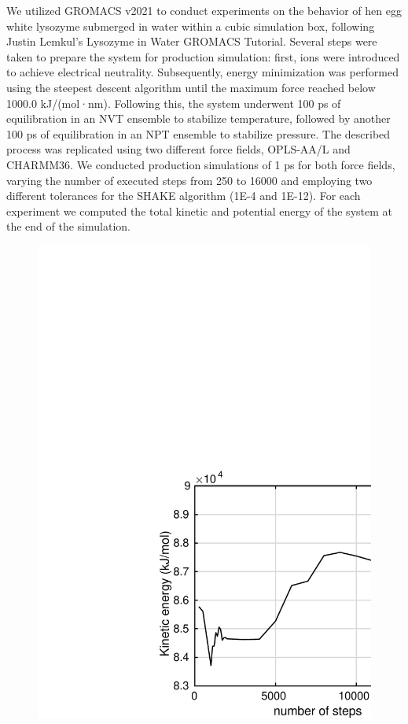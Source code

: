 \documentclass[runningheads]{llncs}
\begin{document}
We utilized GROMACS v2021 to conduct experiments on the behavior of hen egg white lysozyme submerged in water within a cubic simulation box, following Justin Lemkul's Lysozyme in Water GROMACS Tutorial. Several steps were taken to prepare the system for production simulation: first, ions were introduced to achieve electrical neutrality. Subsequently, energy minimization was performed using the steepest descent algorithm until the maximum force reached below 1000.0 kJ/(mol·nm). Following this, the system underwent 100 ps of equilibration in an NVT ensemble to stabilize temperature, followed by another 100 ps of equilibration in an NPT ensemble to stabilize pressure. The described process was replicated using two different force fields, OPLS-AA/L and CHARMM36. We conducted production simulations of 1 ps for both force fields, varying the number of executed steps from 250 to 16000 and employing two different tolerances for the SHAKE algorithm (1E-4 and 1E-12). For each experiment we computed the total kinetic and potential energy of the system at the end of the simulation.

\begin{figure}
  \centering
  \includegraphics[width=12cm]{charmm36tol04.pdf}
\end{figure}
\end{document}

